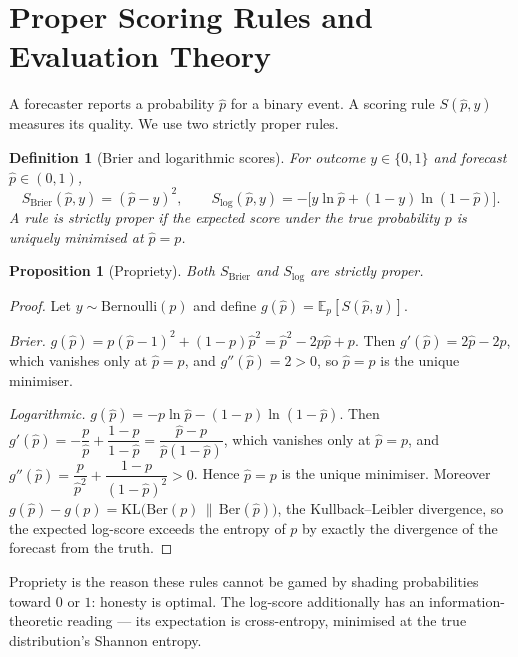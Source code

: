 \documentclass[11pt]{article}
\newtheorem{proposition}{Proposition}
\newtheorem{definition}{Definition}
\begin{document}
\section{Proper Scoring Rules and Evaluation Theory}

A forecaster reports a probability $\hat p$ for a binary event. A scoring rule
$S(\hat p, y)$ measures its quality. We use two strictly proper rules.

\begin{definition}[Brier and logarithmic scores]
For outcome $y \in \{0,1\}$ and forecast $\hat p \in (0,1)$,
\[
S_{\mathrm{Brier}}(\hat p, y) = (\hat p - y)^2, \qquad
S_{\log}(\hat p, y) = -\big[y \ln \hat p + (1-y)\ln(1-\hat p)\big].
\]
A rule is \emph{strictly proper} if the expected score under the true probability
$p$ is uniquely minimised at $\hat p = p$.
\end{definition}

\begin{proposition}[Propriety]
Both $S_{\mathrm{Brier}}$ and $S_{\log}$ are strictly proper.
\end{proposition}

\begin{proof}
Let $y \sim \mathrm{Bernoulli}(p)$ and define $g(\hat p) = \mathbb{E}_p[S(\hat p,y)]$.

\emph{Brier.} $g(\hat p) = p(\hat p-1)^2 + (1-p)\hat p^2
= \hat p^2 - 2p\hat p + p$. Then $g'(\hat p) = 2\hat p - 2p$, which vanishes
only at $\hat p = p$, and $g''(\hat p) = 2 > 0$, so $\hat p = p$ is the unique
minimiser.

\emph{Logarithmic.} $g(\hat p) = -p\ln\hat p - (1-p)\ln(1-\hat p)$. Then
$g'(\hat p) = -\dfrac{p}{\hat p} + \dfrac{1-p}{1-\hat p}
= \dfrac{\hat p - p}{\hat p(1-\hat p)}$, which vanishes only at $\hat p = p$, and
$g''(\hat p) = \dfrac{p}{\hat p^2} + \dfrac{1-p}{(1-\hat p)^2} > 0$. Hence
$\hat p = p$ is the unique minimiser. Moreover
$g(\hat p) - g(p) = \mathrm{KL}\!\big(\mathrm{Ber}(p)\,\|\,\mathrm{Ber}(\hat p)\big)$,
the Kullback--Leibler divergence, so the expected log-score exceeds the entropy
of $p$ by exactly the divergence of the forecast from the truth.
\end{proof}

Propriety is the reason these rules cannot be gamed by shading probabilities
toward $0$ or $1$: honesty is optimal. The log-score additionally has an
information-theoretic reading --- its expectation is cross-entropy, minimised at
the true distribution's Shannon entropy.
\end{document}
